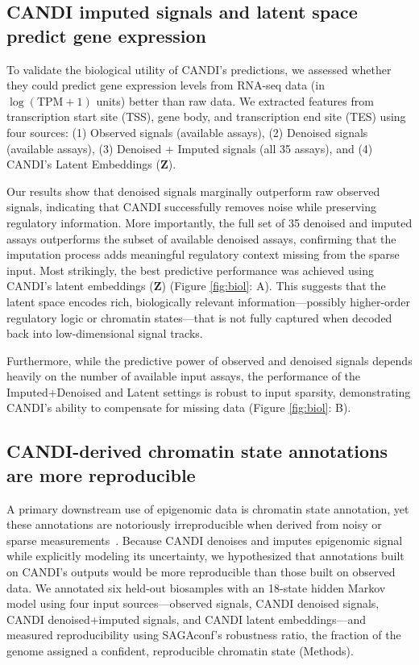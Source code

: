 \subsection{CANDI  imputed signals and latent space predict gene expression}

To validate the biological utility of CANDI's predictions, we assessed whether they could predict gene expression levels from RNA-seq data (in $\log(\text{TPM} + 1)$ units) better than raw data. We extracted features from transcription start site (TSS), gene body, and transcription end site (TES) using four sources: (1) Observed signals (available assays), (2) Denoised signals (available assays), (3) Denoised + Imputed signals (all 35 assays), and (4) CANDI's Latent Embeddings ($\mathbf{Z}$).

Our results show that denoised signals marginally outperform raw observed signals, indicating that CANDI successfully removes noise while preserving regulatory information. More importantly, the full set of 35 denoised and imputed assays outperforms the subset of available denoised assays, confirming that the imputation process adds meaningful regulatory context missing from the sparse input. Most strikingly, the best predictive performance was achieved using CANDI's latent embeddings ($\mathbf{Z}$) (Figure \ref{fig:biol}: A). This suggests that the latent space encodes rich, biologically relevant information---possibly higher-order regulatory logic or chromatin states---that is not fully captured when decoded back into low-dimensional signal tracks.

Furthermore, while the predictive power of observed and denoised signals depends heavily on the number of available input assays, the performance of the Imputed+Denoised and Latent settings is robust to input sparsity, demonstrating CANDI's ability to compensate for missing data (Figure \ref{fig:biol}: B).

\subsection{CANDI-derived chromatin state annotations are more reproducible}

A primary downstream use of epigenomic data is chromatin state annotation, yet these annotations are notoriously irreproducible when derived from noisy or sparse measurements~\cite{shahraki2024robust}. Because CANDI denoises and imputes epigenomic signal while explicitly modeling its uncertainty, we hypothesized that annotations built on CANDI's outputs would be more reproducible than those built on observed data. We annotated six held-out biosamples with an 18-state hidden Markov model using four input sources---observed signals, CANDI denoised signals, CANDI denoised+imputed signals, and CANDI latent embeddings---and measured reproducibility using SAGAconf's robustness ratio, the fraction of the genome assigned a confident, reproducible chromatin state (Methods).

